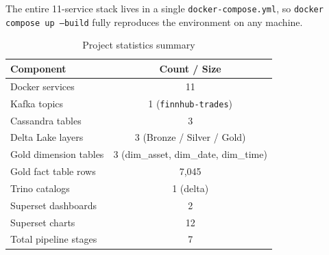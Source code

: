 \documentclass[a4paper]{article}
\begin{document}
The entire 11-service stack lives in a single \texttt{docker-compose.yml},
so \texttt{docker compose up --build} fully reproduces the environment on any
machine.

\begin{table}[H]
\centering
\begin{tabular}{|l|c|}
\hline
\textbf{Component} & \textbf{Count / Size} \\
\hline
Docker services & 11 \\
\hline
Kafka topics & 1 (\texttt{finnhub-trades}) \\
\hline
Cassandra tables & 3 \\
\hline
Delta Lake layers & 3 (Bronze / Silver / Gold) \\
\hline
Gold dimension tables & 3 (dim\_asset, dim\_date, dim\_time) \\
\hline
Gold fact table rows & 7,045 \\
\hline
Trino catalogs & 1 (delta) \\
\hline
Superset dashboards & 2 \\
\hline
Superset charts & 12 \\
\hline
Total pipeline stages & 7 \\
\hline
\end{tabular}
\caption{Project statistics summary}
\end{table}
\end{document}
